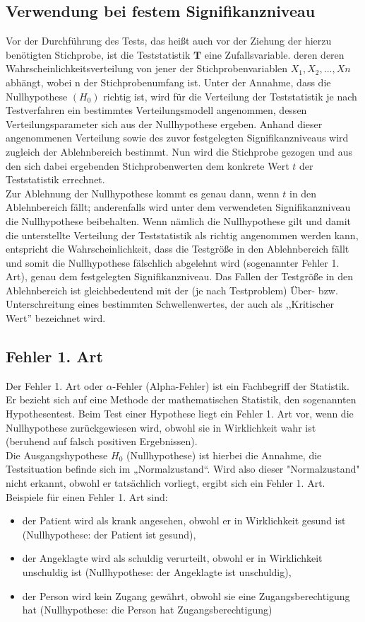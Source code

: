 \subsection{Verwendung bei festem Signifikanzniveau}
Vor der Durchführung des Tests, das heißt auch vor der Ziehung der hierzu benötigten Stichprobe, ist die Teststatistik
$\boldsymbol{T}$ eine Zufallsvariable. deren deren Wahrscheinlichkeitsverteilung von jener der Stichprobenvariablen
${X_1, X_2, ... , Xn}$
abhängt, wobei n der Stichprobenumfang ist.
Unter der Annahme, dass die Nullhypothese $(H_0)$ richtig ist, 
wird für die Verteilung der Teststatistik je nach Testverfahren ein bestimmtes Verteilungsmodell angenommen, dessen Verteilungsparameter sich aus der Nullhypothese ergeben. Anhand dieser angenommenen Verteilung sowie des zuvor festgelegten Signifikanzniveaus wird zugleich der Ablehnbereich bestimmt. Nun wird die Stichprobe gezogen und aus den sich dabei ergebenden Stichprobenwerten dem konkrete Wert ${\displaystyle t}$ der Teststatistik errechnet.\\
Zur Ablehnung der Nullhypothese kommt es genau dann, wenn ${\displaystyle t}$ in den Ablehnbereich fällt; anderenfalls wird unter dem verwendeten Signifikanzniveau die Nullhypothese beibehalten. Wenn nämlich die Nullhypothese gilt und damit die unterstellte Verteilung der Teststatistik als richtig angenommen werden kann, entspricht die Wahrscheinlichkeit, dass die Testgröße in den Ablehnbereich fällt und somit die Nullhypothese fälschlich abgelehnt wird (sogenannter Fehler 1. Art), genau dem festgelegten Signifikanzniveau. Das Fallen der Testgröße in den Ablehnbereich ist gleichbedeutend mit der (je nach Testproblem) Über- bzw. Unterschreitung eines bestimmten Schwellenwertes, der auch als ,,Kritischer Wert'' bezeichnet wird.
\subsection{Fehler 1. Art}
Der Fehler 1. Art oder $\alpha$-Fehler (Alpha-Fehler) ist ein Fachbegriff der Statistik.
Er bezieht sich auf eine Methode der mathematischen Statistik, den sogenannten Hypothesentest. Beim Test einer Hypothese liegt ein Fehler 1. Art vor, wenn die Nullhypothese zurückgewiesen wird, obwohl sie in Wirklichkeit wahr ist (beruhend auf falsch positiven Ergebnissen).\\
Die Ausgangshypothese ${\displaystyle H_{0}}$ (Nullhypothese) ist hierbei die Annahme, die Testsituation befinde sich im „Normalzustand“. Wird also dieser "Normalzustand" nicht erkannt, obwohl er tatsächlich vorliegt, ergibt sich ein Fehler 1. Art. Beispiele für einen Fehler 1. Art sind:
    \begin{itemize}
    \item der Patient wird als krank angesehen, obwohl er in Wirklichkeit gesund ist (Nullhypothese: der Patient ist gesund),
    \item der Angeklagte wird als schuldig verurteilt, obwohl er in Wirklichkeit unschuldig ist (Nullhypothese: der Angeklagte ist unschuldig),
    \item der Person wird kein Zugang gewährt, obwohl sie eine Zugangsberechtigung hat (Nullhypothese: die Person hat Zugangsberechtigung)
    \end{itemize}

